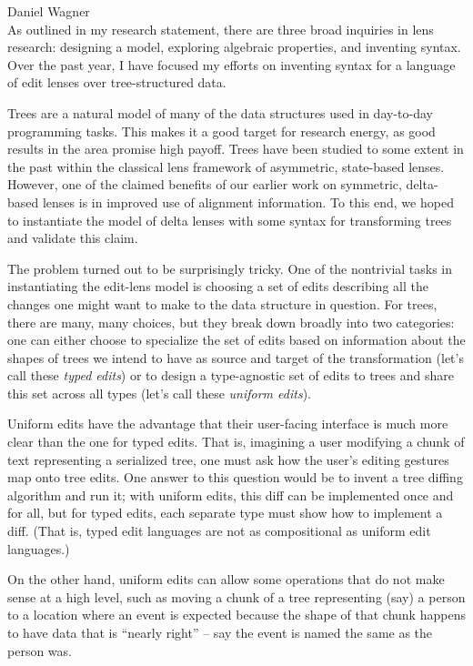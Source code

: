 \documentclass{article}
\begin{document}
{\noindent\large Daniel Wagner}\\[3ex]

As outlined in my research statement, there are three broad inquiries in
lens research: designing a model, exploring algebraic properties, and
inventing syntax. Over the past year, I have focused my efforts on inventing
syntax for a language of edit lenses over tree-structured data.

Trees are a natural model of many of the data structures used in day-to-day
programming tasks. This makes it a good target for research energy, as good
results in the area promise high payoff. Trees have been studied to some
extent in the past within the classical lens framework of asymmetric,
state-based lenses. However, one of the claimed benefits of our earlier work
on symmetric, delta-based lenses is in improved use of alignment
information. To this end, we hoped to instantiate the model of delta lenses
with some syntax for transforming trees and validate this claim.

The problem turned out to be surprisingly tricky. One of the nontrivial
tasks in instantiating the edit-lens model is choosing a set of edits
describing all the changes one might want to make to the data structure in
question. For trees, there are many, many choices, but they break down
broadly into two categories: one can either choose to specialize the set of
edits based on information about the shapes of trees we intend to have as
source and target of the transformation (let's call these \emph{typed
edits}) or to design a type-agnostic set of edits to trees and share this
set across all types (let's call these \emph{uniform edits}).

Uniform edits have the advantage that their user-facing interface is much
more clear than the one for typed edits. That is, imagining a user modifying
a chunk of text representing a serialized tree, one must ask how the user's
editing gestures map onto tree edits. One answer to this question would be
to invent a tree diffing algorithm and run it; with uniform edits, this diff
can be implemented once and for all, but for typed edits, each separate type
must show how to implement a diff. (That is, typed edit languages are not as
compositional as uniform edit languages.)

On the other hand, uniform edits can allow some operations that do not make
sense at a high level, such as moving a chunk of a tree representing (say) a
person to a location where an event is expected because the shape of that
chunk happens to have data that is ``nearly right'' -- say the event is
named the same as the person was.
\end{document}
